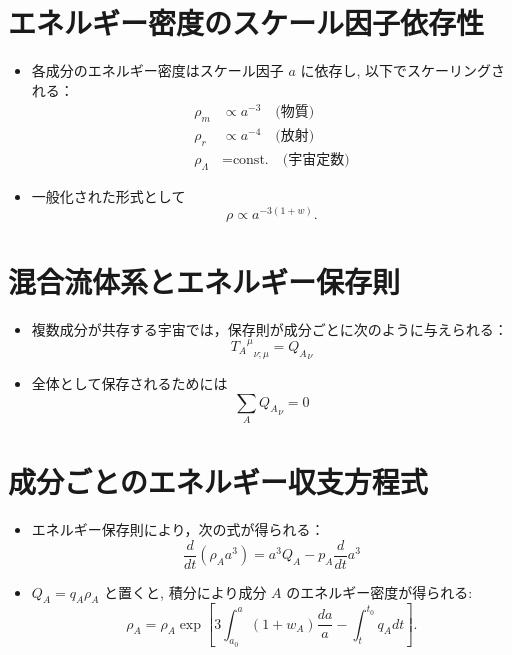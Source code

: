 \documentclass[a4paper,12pt]{article}
\begin{document}
\section*{エネルギー密度のスケール因子依存性}

\begin{itemize}
  \item 各成分のエネルギー密度はスケール因子 $a$ に依存し, 以下でスケーリングされる：
  \begin{align*}
    \rho_m &\propto a^{-3} \quad \text{(物質)} \\
    \rho_r &\propto a^{-4} \quad \text{(放射)} \\
    \rho_\Lambda &= \text{const.} \quad \text{(宇宙定数)}
  \end{align*}
  \item 一般化された形式として
  \begin{equation*}
    \rho \propto a^{-3(1 + w)}.
  \end{equation*}
\end{itemize}

\section*{混合流体系とエネルギー保存則}

\begin{itemize}
  \item 複数成分が共存する宇宙では，保存則が成分ごとに次のように与えられる：
  \begin{equation*}
    {{T_A}^{\mu}}_{\nu ;\mu} = {Q_A}_{\nu}
  \end{equation*}
  \item 全体として保存されるためには
  \begin{equation*}
    \sum_A {Q_A}_{\nu} = 0
  \end{equation*}
\end{itemize}

\section*{成分ごとのエネルギー収支方程式}

\begin{itemize}
  \item エネルギー保存則により，次の式が得られる：
  \begin{equation*}
    \frac{d}{dt} (\rho_A a^3) = a^3 Q_A - p_A \frac{d}{dt} a^3
  \end{equation*}
  \item $Q_A = q_A \rho_A$ と置くと, 積分により成分 $A$ のエネルギー密度が得られる:
  \begin{equation*}
    \rho_A = \rho_{A} \exp \left[ 3 \int_{a_0}^{a} \left(1 + w_A \right) \frac{da}{a} - \int_{t}^{t_0} q_A dt \right].
  \end{equation*}
\end{itemize}
\end{document}

